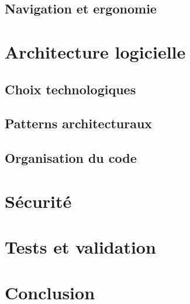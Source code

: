 \subsection{Navigation et ergonomie}

\section{Architecture logicielle}

\subsection{Choix technologiques}

\subsection{Patterns architecturaux}

\subsection{Organisation du code}

\section{Sécurité}

\section{Tests et validation}

\section{Conclusion}
